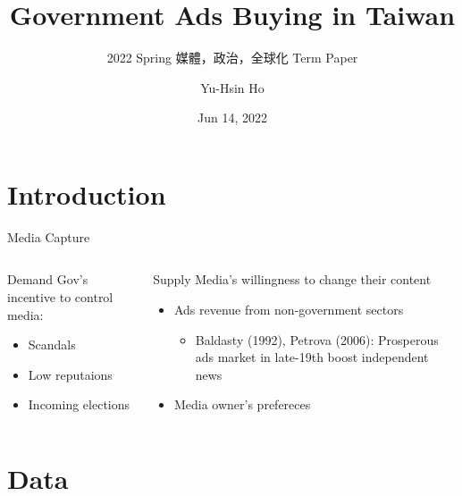 \documentclass[
  10pt,
  ignorenonframetext,
  aspectratio=169,
]{beamer}
\title{Government Ads Buying in Taiwan}
\subtitle{2022 Spring 媒體，政治，全球化 Term Paper}
\author{Yu-Hsin Ho}
\date{Jun 14, 2022}
\institute{Department of Economics, National Taiwan University}
\providecommand{\tightlist}{%
  \setlength{\itemsep}{0pt}\setlength{\parskip}{0pt}}
\begin{document}
\frame{\titlepage}

\hypertarget{introduction}{%
\section{Introduction}\label{introduction}}

\begin{frame}{Media Capture}
\protect\hypertarget{media-capture}{}
\begin{columns}[T]
\begin{column}{0.35\textwidth}
\begin{block}{Demand}
\protect\hypertarget{demand}{}
Gov's incentive to control media:

\begin{itemize}
\tightlist
\item
  Scandals
\item
  Low reputaions
\item
  Incoming elections
\end{itemize}
\end{block}
\end{column}

\begin{column}{0.6\textwidth}
\begin{block}{Supply}
\protect\hypertarget{supply}{}
Media's willingness to change their content

\begin{itemize}
\tightlist
\item
  Ads revenue from non-government sectors

  \begin{itemize}
  \tightlist
  \item
    Baldasty (1992), Petrova (2006): Prosperous ads market in late-19th
    boost independent news
  \end{itemize}
\item
  Media owner's prefereces
\end{itemize}
\end{block}
\end{column}
\end{columns}
\end{frame}

\hypertarget{data}{%
\section{Data}\label{data}}
\end{document}

